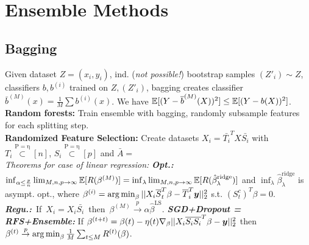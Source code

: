 \section*{Ensemble Methods}
\subsection*{Bagging}
Given dataset $Z ={(x_i,y_i)}$, ind. (\emph{not possible!}) bootstrap samples $(Z'_i) \sim Z$, classifiers $b, b^{(i)}$ trained on $Z, (Z'_i)$, bagging creates classifier $\bar{b}^{(M)}(x) = \frac{1}{M}\sum b^{(i)}(x)$. We have $\mathbb{E}[(Y-\overline{b}^{(M)}(X))^2] \leq \mathbb{E}[(Y-b(X))^2]$.\\
\textbf{Random forests:} Train ensemble with bagging, randomly subsample features for each splitting step.\\
\textbf{Randomized Feature Selection:} Create datasets $X_i = \bar{T_i}^TX\bar{S_i}$ with $T_i \overset{\mathrm{P= \eta}}{\subset} [n]$, $S_i \overset{\mathrm{P=\eta}}{\subset} [p]$ and $\bar{A} =$\\
\emph{Theorems for case of linear regression:}
\emph{\textbf{Opt.:}} $\inf_{\alpha\leq\frac{p}{n}}\lim_{M,n,p\to\infty}\mathbb{E}[R(\beta^{(M)})] = \inf_{\lambda}\lim_{M,n,p\to\infty}\mathbb{E}[R(\hat{\beta}_{\lambda}^{\mathrm{ridge}})]$ and $\inf_{\lambda}\hat{\beta}_{\lambda}^{\mathrm{ridge}}$ is asympt. opt., where $\beta^{(i)} = \operatorname*{arg\,min}_\beta ||X_i\overline{S}_t^T\beta - \overline{T}_i^T{\bm{y}}||^2_2$ s.t. $(S^c_t)^T\beta=0$.\\
\mbox{\emph{\textbf{Regu.:}} If $X_i = X_i\bar{S_i}$ then $\beta^{(M)}\overset{p}{\to}\alpha\hat{\beta}^{\mathrm{LS}}$.}
\emph{\textbf{SGD+Dropout = RFS+Ensemble:}} If $\beta^{(t+t)} = \beta{(t)}-\eta(t)\nabla_\beta||X_i\overline{S_i}\overline{S_i}^T\beta - {\bm{y}}||^2_2$ then $\beta^{(t)} \overset{p}{\to}\operatorname*{arg\,min}_\beta \frac{1}{M}\sum_{t\leq M}R^{(t)}(\beta)$.

